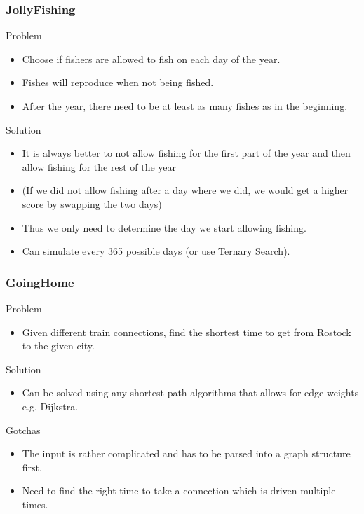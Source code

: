\documentclass{beamer}
\begin{document}
\begin{frame}
    \frametitle{JollyFishing}
    \begin{block}{Problem}
        \begin{itemize}
            \item Choose if fishers are allowed to fish on each day of the year.
            \item Fishes will reproduce when not being fished.
            \item After the year, there need to be at least as many fishes as in the beginning.
        \end{itemize}
    \end{block}
    \begin{block}{Solution}
        \begin{itemize}
            \item It is always better to not allow fishing for the first part of the year and then allow fishing for the rest of the year
            \item (If we did not allow fishing after a day where we did, we would get a higher score by swapping the two days)
            \item Thus we only need to determine the day we start allowing fishing.
            \item Can simulate every 365 possible days (or use Ternary Search).
        \end{itemize}
    \end{block}
\end{frame}

\begin{frame}
    \frametitle{GoingHome}
    \begin{block}{Problem}
        \begin{itemize}
            \item Given different train connections, find the shortest time to get from Rostock to the given city.
        \end{itemize}
    \end{block}
    \begin{block}{Solution}
        \begin{itemize}
            \item Can be solved using any shortest path algorithms that allows for edge weights e.g. Dijkstra.
        \end{itemize}
    \end{block}
    \begin{block}{Gotchas}
        \begin{itemize}
            \item The input is rather complicated and has to be parsed into a graph structure first.
            \item Need to find the right time to take a connection which is driven multiple times.
        \end{itemize}
    \end{block}
\end{frame}
\end{document}
